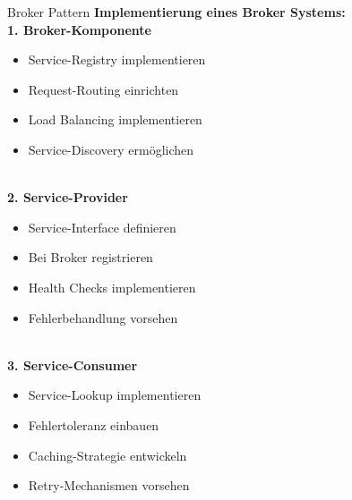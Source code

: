 \begin{KR}{Broker Pattern}
\textbf{Implementierung eines Broker Systems:}
\vspace{1mm}\\
\textbf{1. Broker-Komponente}

\begin{minipage}[t]{0.5\textwidth}
\begin{itemize}
    \item Service-Registry implementieren
    \item Request-Routing einrichten
\end{itemize}
\end{minipage}
\begin{minipage}[t]{0.5\textwidth}
\begin{itemize}
    \item Load Balancing implementieren
    \item Service-Discovery ermöglichen
\end{itemize}
\end{minipage}
\vspace{1mm}\\
\textbf{2. Service-Provider}

\begin{minipage}[t]{0.5\textwidth}
\begin{itemize}
    \item Service-Interface definieren
    \item Bei Broker registrieren
\end{itemize}
\end{minipage}
\begin{minipage}[t]{0.5\textwidth}
\begin{itemize}
    \item Health Checks implementieren
    \item Fehlerbehandlung vorsehen
\end{itemize}
\end{minipage}
\vspace{1mm}\\
\textbf{3. Service-Consumer}

\begin{minipage}[t]{0.5\textwidth}
\begin{itemize}
    \item Service-Lookup implementieren
    \item Fehlertoleranz einbauen
\end{itemize}
\end{minipage}
\begin{minipage}[t]{0.5\textwidth}
\begin{itemize}
    \item Caching-Strategie entwickeln
    \item Retry-Mechanismen vorsehen
\end{itemize}
\end{minipage}
\end{KR}

